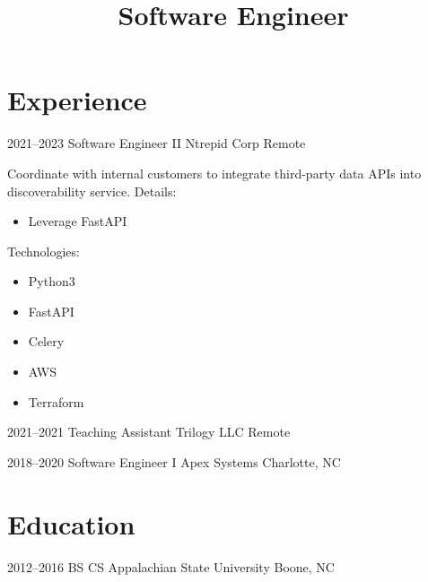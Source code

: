 \documentclass[11pt,a4paper,sans]{moderncv}
\title{Software Engineer}
\begin{document}
\maketitle

\section{Experience}

\cventry
    {2021--2023}
    {Software Engineer II}
    {Ntrepid Corp}
    {Remote}
    {}
    {
        Coordinate with internal customers to integrate third-party data APIs into discoverability service.\newline{}
        Details:
        \begin{itemize}
            \item Leverage FastAPI 
        \end{itemize}
        Technologies:
        \begin{itemize}
            \item Python3
            \item FastAPI
            \item Celery
            \item AWS
            \item Terraform
        \end{itemize}
    }

\cventry
    {2021--2021}
    {Teaching Assistant}
    {Trilogy LLC}
    {Remote}
    {}
    {}

\cventry
    {2018--2020}
    {Software Engineer I}
    {Apex Systems}
    {Charlotte, NC}
    {}
    {}

\section{Education}
\cventry
    {2012--2016}
    {BS CS}
    {Appalachian State University}
    {Boone, NC}
    {}
    {}
\end{document}
